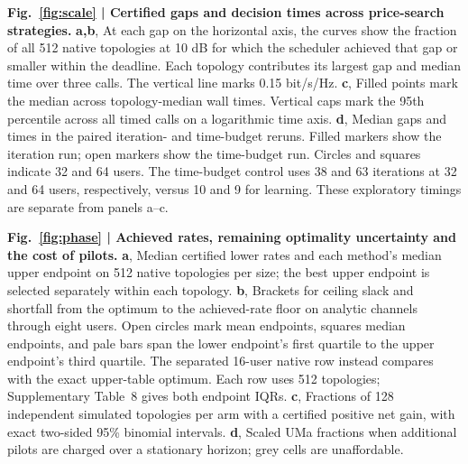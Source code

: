 \documentclass[lineno,pdflatex,sn-nature]{sn-jnl}
\begin{document}
\noindent\textbf{Fig.~\ref{fig:scale} | Certified gaps and decision times across price-search strategies.} \textbf{a,b}, At each gap on the horizontal axis, the curves show the fraction of all 512 native topologies at 10 dB for which the scheduler achieved that gap or smaller within the deadline. Each topology contributes its largest gap and median time over three calls. The vertical line marks 0.15 bit/s/Hz. \textbf{c}, Filled points mark the median across topology-median wall times. Vertical caps mark the 95th percentile across all timed calls on a logarithmic time axis. \textbf{d}, Median gaps and times in the paired iteration- and time-budget reruns. Filled markers show the iteration run; open markers show the time-budget run. Circles and squares indicate 32 and 64 users. The time-budget control uses 38 and 63 iterations at 32 and 64 users, respectively, versus 10 and 9 for learning. These exploratory timings are separate from panels a--c.\par\medskip
\noindent\textbf{Fig.~\ref{fig:phase} | Achieved rates, remaining optimality uncertainty and the cost of pilots.} \textbf{a}, Median certified lower rates and each method's median upper endpoint on 512 native topologies per size; the best upper endpoint is selected separately within each topology. \textbf{b}, Brackets for ceiling slack and shortfall from the optimum to the achieved-rate floor on analytic channels through eight users. Open circles mark mean endpoints, squares median endpoints, and pale bars span the lower endpoint's first quartile to the upper endpoint's third quartile. The separated 16-user native row instead compares with the exact upper-table optimum. Each row uses 512 topologies; Supplementary Table~8 gives both endpoint IQRs. \textbf{c}, Fractions of 128 independent simulated topologies per arm with a certified positive net gain, with exact two-sided 95\% binomial intervals. \textbf{d}, Scaled UMa fractions when additional pilots are charged over a stationary horizon; grey cells are unaffordable.\par\medskip
\end{document}
